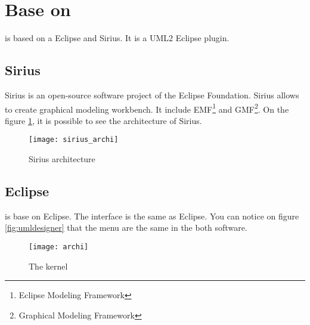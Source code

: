 \section{Base on}

\umld is based on a Eclipse and Sirius. It is a UML2 Eclipse plugin.

\subsection{Sirius}
Sirius is an open-source software project of the Eclipse Foundation. Sirius allows to create graphical modeling workbench. It include EMF\footnote{Eclipse Modeling Framework} and GMF\footnote{Graphical Modeling Framework}. On the figure \ref{fig:sirius}, it is possible to see the architecture of Sirius.


\begin{figure}[h]
  \centering
  \texttt{[image: sirius\_archi]}
  \caption{Sirius architecture\cite{sirius}}
  \label{fig:sirius}
\end{figure}

\subsection{Eclipse}

\umld is base on Eclipse.
The interface is the same as Eclipse. You can notice on figure
\ref{fig:umldesigner} that the menu are the same in the both software.



\begin{figure}[h] \centering
  \texttt{[image: archi]}
  \caption{The \umld kernel}
  \label{fig:kernel}
\end{figure}






